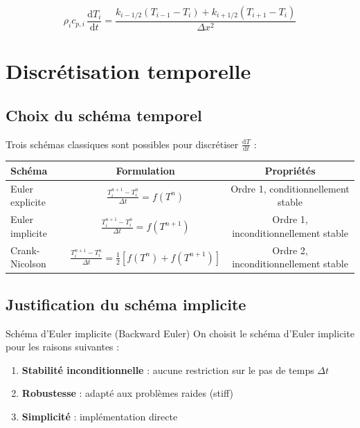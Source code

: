 \documentclass[11pt,a4paper]{article}
\newcommand{\dd}{\mathrm{d}}
\begin{document}
\begin{tcolorbox}[colback=blue!5,colframe=bleu,title=\textbf{Équation semi-discrète}]
\begin{equation}
\rho_i c_{p,i} \, \frac{\dd T_i}{\dd t} = \frac{k_{i-1/2}(T_{i-1} - T_i) + k_{i+1/2}(T_{i+1} - T_i)}{\Delta x^2}
\label{eq:semi_discrete}
\end{equation}
\end{tcolorbox}

\section{Discrétisation temporelle}

\subsection{Choix du schéma temporel}

Trois schémas classiques sont possibles pour discrétiser $\frac{\dd T}{\dd t}$ :

\begin{center}
\begin{tabular}{lcc}
\toprule
\textbf{Schéma} & \textbf{Formulation} & \textbf{Propriétés} \\
\midrule
Euler explicite & $\frac{T_i^{n+1} - T_i^n}{\Delta t} = f(T^n)$ & Ordre 1, conditionnellement stable \\
Euler implicite & $\frac{T_i^{n+1} - T_i^n}{\Delta t} = f(T^{n+1})$ & Ordre 1, inconditionnellement stable \\
Crank-Nicolson & $\frac{T_i^{n+1} - T_i^n}{\Delta t} = \frac{1}{2}[f(T^n) + f(T^{n+1})]$ & Ordre 2, inconditionnellement stable \\
\bottomrule
\end{tabular}
\end{center}

\subsection{Justification du schéma implicite}

\begin{hypothese}{Schéma d'Euler implicite (Backward Euler)}{}
On choisit le schéma d'Euler implicite pour les raisons suivantes :
\begin{enumerate}
    \item \textbf{Stabilité inconditionnelle} : aucune restriction sur le pas de temps $\Delta t$
    \item \textbf{Robustesse} : adapté aux problèmes raides (stiff)
    \item \textbf{Simplicité} : implémentation directe
\end{enumerate}
\end{hypothese}
\end{document}
